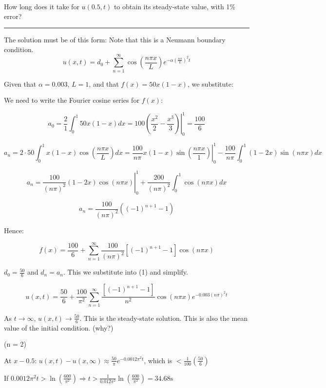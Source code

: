 \documentclass{article}
\begin{document}
How long does it take for $u(0.5,t)$ to obtain its steady-state value, with 1\% error?

\hfill

\hrule

\hfill

The solution must be of this form: Note that this is a Neumann boundary condition. 
\begin{equation}
    u(x,t) = d_0 + \sum_{n = 1}^\infty \cos \left(\frac{n \pi x}{L} \right) e^{- \alpha \left( \frac{n \pi }{L} \right) ^2 t}
\end{equation}

Given that $\alpha = 0.003$, $L = 1$, and that $f(x) = 50x (1-x)$, we substitute:

We need to write the Fourier cosine series for $f(x)$:

$$a_0 = \frac{2}{1} \int_0^1 50x(1-x) dx = \left. 100 \left( \frac{x^2}{2} - \frac{x^3}{3} \right) \right|_0^1 = \frac{100}{6}$$

$$a_n = 2 \cdot 50 \int_0^1 x(1-x) \cos \left( \frac{n \pi x}{L} \right) dx = \left. \frac{100}{n \pi} x (1-x) \sin  \left( \frac{n \pi x}{1} \right) \right|_0^1 - \frac{100}{n \pi} \int_0^1 (1-2x) \sin (n \pi x) dx$$

$$a_n = \left. \frac{100}{(n \pi)^2} (1 - 2x) \cos(n \pi x) \right|_0^1 + \frac{200}{(n \pi)^2} \int_0^1 \cos(n \pi x) dx$$

$$a_n = \frac{100}{(n \pi)^2} \left( (-1)^{n+1} - 1 \right)$$

Hence:

$$f(x) = \frac{100}{6} + \sum_{n = 1}^\infty \frac{100}{(n \pi)^2} \left[(-1)^{n+1} - 1 \right] \cos(n \pi x)$$

$d_0 = \frac{50}{6}$ and $d_n = a_n$. This we substitute into (1) and simplify. 


$$u(x,t) = \frac{50}{6} + \frac{100}{\pi^2} \sum_{n = 1}^\infty \frac{\left[ (-1)^{n+1} - 1 \right]}{n^2} \cos(n \pi x) e^{- 0.003 (n \pi)^2 t}$$

As $t \to \infty$, $u(x,t) \to \frac{50}{6}$. This is the steady-state solution. This is also the mean value of the initial condition. (why?)

(n = 2)
\hfill

At $x - 0.5$: $u(x,t) - u(x,\infty) \approx \frac{50}{\pi} e^{-0.0012 \pi^2 t}$, which is $< \frac{1}{100} (\frac{50}{6})$

\hfill

If $0.0012 \pi^2 t > \ln(\frac{600}{\pi^2}) \Rightarrow t > \frac{1}{0.012 \pi^2} \ln \left( \frac{600}{\pi^2} \right) = 34.68 \text{s}$
\end{document}
